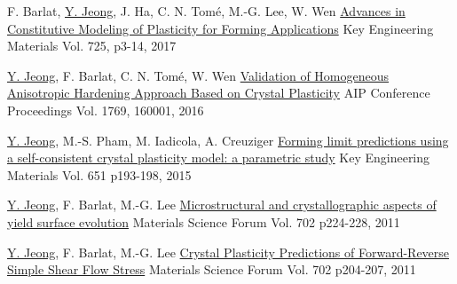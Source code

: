 \begin{cventries}
  \cventry
  {F. Barlat, \underline{Y. Jeong}, J. Ha, C. N. Tom\'{e}, M.-G. Lee, W. Wen}
  {\href{https://dx.doi.org/10.4028/www.scientific.net/KEM.725.3}{Advances in Constitutive Modeling of Plasticity for Forming Applications}}
  {Key Engineering Materials}
  {Vol. 725, p3-14, 2017}
  {
  }

  \cventry
  {\underline{Y. Jeong}, F. Barlat, C. N. Tom\'{e}, W. Wen}
  {\href{http://dx.doi.org/10.1063/1.4963544}{Validation of Homogeneous Anisotropic Hardening Approach Based on Crystal Plasticity}}
  {AIP Conference Proceedings}
  {Vol. 1769, 160001, 2016}
  {
  }


  \cventry
  {\underline{Y. Jeong}, M.-S. Pham, M. Iadicola, A. Creuziger}
  {\href{https://doi.org/10.4028/www.scientific.net/KEM.651-653.193}{Forming limit predictions using a self-consistent crystal plasticity model: a parametric study}}
  {Key Engineering Materials}
  {Vol. 651 p193-198, 2015  }
  {
  }


  \cventry
  {\underline{Y. Jeong}, F. Barlat, M.-G. Lee}
  {\href{https://doi.org/10.4028/www.scientific.net/MSF.702-703.224}{Microstructural and crystallographic aspects of yield surface evolution}}
  {Materials Science Forum}
  {Vol. 702 p224-228, 2011}
  {
  }

  \cventry
  {\underline{Y. Jeong}, F. Barlat, M.-G. Lee}
  {\href{https://doi.org/10.4028/www.scientific.net/MSF.702-703.204}{Crystal Plasticity Predictions of Forward-Reverse Simple Shear Flow Stress}}
  {Materials Science Forum}
  {Vol. 702 p204-207, 2011}
  {
  }
\item

\end{cventries}
